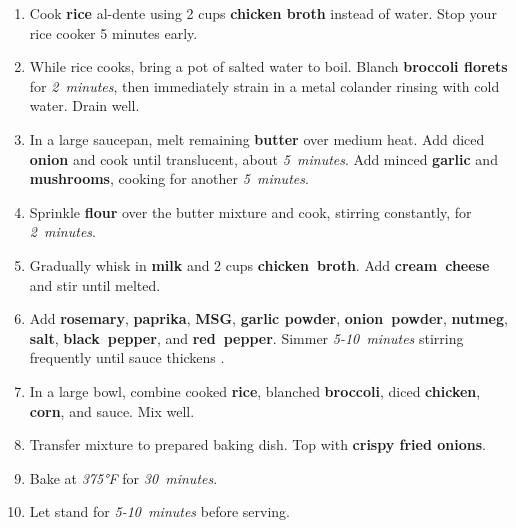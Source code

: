 \documentclass[11pt,letterpaper]{article}
\begin{document}
\begin{enumerate}
    \item Cook \textbf{rice} al-dente using 2 cups \textbf{chicken broth} instead of water. Stop your rice cooker 5 minutes early.
    
    \item While rice cooks, bring a pot of salted water to boil. Blanch \textbf{broccoli florets} for \textit{2~minutes}, then immediately strain in a metal colander rinsing with cold water. Drain well.
    
    \item In a large saucepan, melt remaining \textbf{butter} over medium heat. Add diced \textbf{onion} and cook until translucent, about \textit{5~minutes}. Add minced \textbf{garlic} and \textbf{mushrooms}, cooking for another \textit{5~minutes}.
    
    \item Sprinkle \textbf{flour} over the butter mixture and cook, stirring constantly, for \textit{2~minutes}.
    
    \item Gradually whisk in \textbf{milk} and 2 cups \textbf{chicken~broth}. Add \textbf{cream~cheese} and stir until melted.
    
    \item Add \textbf{rosemary}, \textbf{paprika}, \textbf{MSG}, \textbf{garlic powder}, \textbf{onion~powder}, \textbf{nutmeg}, \textbf{salt},  \textbf{black~pepper}, and \textbf{red~pepper}. Simmer \textit{5-10~minutes} stirring frequently until sauce thickens .
    
    \item In a large bowl, combine cooked \textbf{rice}, blanched \textbf{broccoli}, diced \textbf{chicken}, \textbf{corn}, and sauce. Mix well.
    
    \item Transfer mixture to prepared baking dish. Top with \textbf{crispy fried onions}.
    
    \item Bake at \textit{375°F} for \textit{30~minutes}.
    
    \item Let stand for \textit{5-10~minutes} before serving.
\end{enumerate}

\newpage
\end{document}
